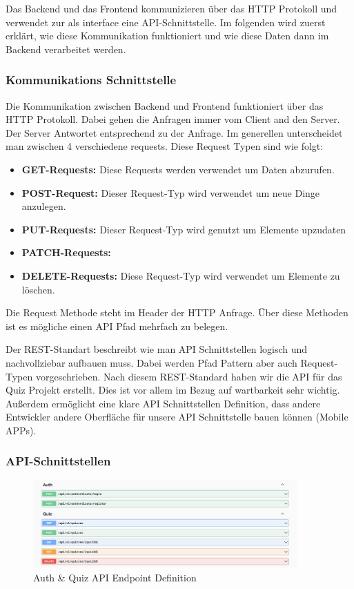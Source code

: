 Das Backend und das Frontend kommunizieren über das HTTP Protokoll und verwendet zur als interface eine API-Schnittstelle.
Im folgenden wird zuerst erklärt, wie diese Kommunikation funktioniert und wie diese Daten dann im Backend verarbeitet werden.

\subsubsection{Kommunikations Schnittstelle}

Die Kommunikation zwischen Backend und Frontend funktioniert über das HTTP Protokoll.
Dabei gehen die Anfragen immer vom Client and den Server. Der Server Antwortet entsprechend zu der Anfrage.
Im generellen unterscheidet man zwischen 4 verschiedene requests. Diese Request Typen sind wie folgt:

\begin{itemize}
\item \textbf{GET-Requests:} Diese Requests werden verwendet um Daten abzurufen.
\item \textbf{POST-Request:} Dieser Request-Typ wird verwendet um neue Dinge anzulegen.
\item \textbf{PUT-Requests:} Dieser Request-Typ wird genutzt um Elemente upzudaten
\item \textbf{PATCH-Requests:}
\item \textbf{DELETE-Requests:} Diese Request-Typ wird verwendet um Elemente zu löschen.
\end{itemize}

\noindent Die Request Methode steht im Header der HTTP Anfrage. Über diese Methoden ist es mögliche einen
API Pfad mehrfach zu belegen. \newline

\noindent Der REST-Standart beschreibt wie man API Schnittstellen logisch und nachvollziebar aufbauen muss.
Dabei werden Pfad Pattern aber auch Request-Typen vorgeschrieben. Nach diesem REST-Standard haben wir die API
für das Quiz Projekt erstellt. Dies ist vor allem im Bezug auf wartbarkeit sehr wichtig. Außerdem ermöglicht
eine klare API Schnittstellen Definition, dass andere Entwickler andere Oberfläche für unsere API Schnittstelle bauen können (Mobile APPs).

\subsubsection{API-Schnittstellen}

\begin{figure}[H]
  \centering
  \includegraphics[width=0.9\textwidth]{img/Auth_Quiz-Endpoint.png}
  \caption{Auth \& Quiz API Endpoint Definition}
\end{figure}


